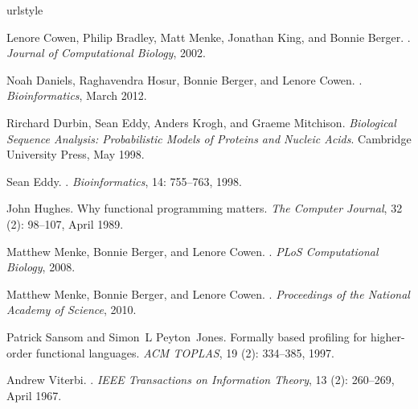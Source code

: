 \documentclass[preprint,nonatbib,blockstyle,times]{sigplanconf}
\begin{document}
\begin{thebibliography}{9}
\providecommand{\natexlab}[1]{#1}
\providecommand{\url}[1]{\texttt{#1}}
\expandafter\ifx\csname urlstyle\endcsname\relax
  \providecommand{\doi}[1]{doi: #1}\else
  \providecommand{\doi}{doi: \begingroup \urlstyle{rm}\Url}\fi

Lenore Cowen, Philip Bradley, Matt Menke, Jonathan King, and Bonnie Berger.
.
\newblock \emph{Journal of Computational Biology}, 2002.

Noah Daniels, Raghavendra Hosur, Bonnie Berger, and Lenore Cowen.
.
\newblock \emph{Bioinformatics}, March 2012.

Rirchard Durbin, Sean Eddy, Anders Krogh, and Graeme Mitchison.
\newblock \emph{{Biological Sequence Analysis: Probabilistic Models of Proteins
  and Nucleic Acids}}.
\newblock Cambridge University Press, May 1998.

Sean Eddy.
.
\newblock \emph{Bioinformatics}, 14: 755--763, 1998.

John Hughes.
\newblock Why functional programming matters.
\newblock \emph{The Computer Journal}, 32 (2): 98--107, April
  1989.

Matthew Menke, Bonnie Berger, and Lenore Cowen.
.
\newblock \emph{PLoS Computational Biology}, 2008.

Matthew Menke, Bonnie Berger, and Lenore Cowen.
.
\newblock \emph{Proceedings of the National Academy of Science}, 2010.

Patrick Sansom and Simon~L Peyton~Jones.
\newblock Formally based profiling for higher-order functional languages.
\newblock \emph{ACM TOPLAS}, 19 (2): 334--385, 1997.

Andrew Viterbi.
.
\newblock \emph{IEEE Transactions on Information Theory}, 13
  (2): 260--269, April 1967.

\end{thebibliography}
\fi
\end{document}

